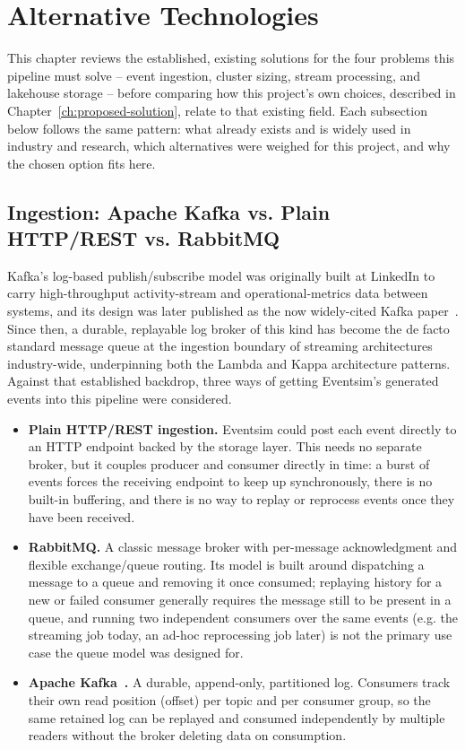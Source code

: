 \section{Alternative Technologies}

This chapter reviews the established, existing solutions for the four problems this pipeline must solve -- event ingestion, cluster sizing, stream processing, and lakehouse storage -- before comparing how this project's own choices, described in Chapter~\ref{ch:proposed-solution}, relate to that existing field. Each subsection below follows the same pattern: what already exists and is widely used in industry and research, which alternatives were weighed for this project, and why the chosen option fits here.

\subsection{Ingestion: Apache Kafka vs. Plain HTTP/REST vs. RabbitMQ}
\label{sec:kafka-vs-alt}

Kafka's log-based publish/subscribe model was originally built at LinkedIn to carry high-throughput activity-stream and operational-metrics data between systems, and its design was later published as the now widely-cited Kafka paper~\cite{kafka}. Since then, a durable, replayable log broker of this kind has become the de facto standard message queue at the ingestion boundary of streaming architectures industry-wide, underpinning both the Lambda and Kappa architecture patterns. Against that established backdrop, three ways of getting Eventsim's generated events into this pipeline were considered.

\begin{itemize}
    \item \textbf{Plain HTTP/REST ingestion.} Eventsim could post each event directly to an HTTP endpoint backed by the storage layer. This needs no separate broker, but it couples producer and consumer directly in time: a burst of events forces the receiving endpoint to keep up synchronously, there is no built-in buffering, and there is no way to replay or reprocess events once they have been received.
    \item \textbf{RabbitMQ.} A classic message broker with per-message acknowledgment and flexible exchange/queue routing. Its model is built around dispatching a message to a queue and removing it once consumed; replaying history for a new or failed consumer generally requires the message still to be present in a queue, and running two independent consumers over the same events (e.g. the streaming job today, an ad-hoc reprocessing job later) is not the primary use case the queue model was designed for.
    \item \textbf{Apache Kafka~\cite{kafka}.} A durable, append-only, partitioned log. Consumers track their own read position (offset) per topic and per consumer group, so the same retained log can be replayed and consumed independently by multiple readers without the broker deleting data on consumption.
\end{itemize}

